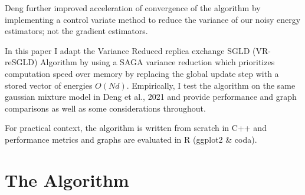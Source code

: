 \documentclass{article}
\begin{document}
Deng further improved acceleration of convergence of the algorithm \cite{deng2021acceleratingconvergencereplicaexchange} by implementing a control variate method to reduce the variance of our noisy energy estimators; not the gradient estimators.


In this paper I adapt the Variance Reduced replica exchange SGLD (VR-reSGLD) Algorithm by using a SAGA \cite{gower2020variancereducedmethodsmachinelearning} variance reduction which prioritizes computation speed over memory by replacing the global update step with a stored vector of energies $O(Nd)$. Empirically, I test the algorithm on the same gaussian mixture model in Deng et al., 2021 \cite{deng2021acceleratingconvergencereplicaexchange} and provide performance and graph comparisons as well as some considerations throughout.

For practical context, the algorithm is written from scratch in C++ and performance metrics and graphs are evaluated in R (ggplot2 \& coda).

\newpage
\section{The Algorithm}
\end{document}
